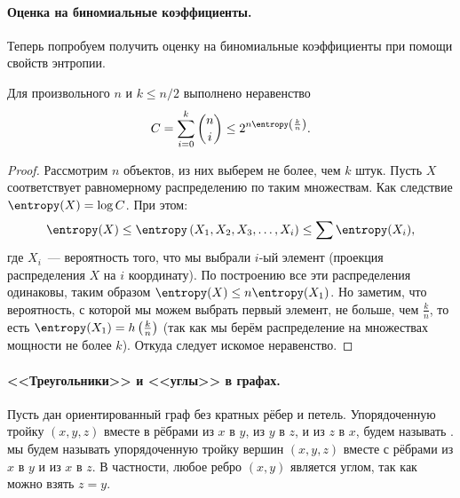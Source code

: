 \paragraph{Оценка на биномиальные коэффициенты.}
Теперь попробуем получить оценку на биномиальные коэффициенты при помощи свойств энтропии.

\begin{proposition}
    \label{prop:binomial-coef}
	Для произвольного $n$ и $k \le n / 2$ выполнено неравенство
    $$
        C = \sum_{i = 0}^k \binom{n}{i} \le 2^{n \entropy\left(\frac{k}{n}\right)}.
    $$
\end{proposition}

\begin{proof}
    Рассмотрим $n$ объектов, из них выберем не более, чем $k$ штук. Пусть $X$ соответствует равномерному
    распределению по таким множествам. Как следствие $\entropy(X) = \log C$. При этом:
    $$
        \entropy(X) \le \entropy\left(X_1, X_2, X_3, \dots, X_i\right) \le \sum \entropy(X_i),
    $$
    где $X_i$~--- вероятность того, что мы выбрали $i$-ый элемент (проекция распределения $X$ на $i$
    координату). По построению все эти распределения одинаковы, таким образом $\entropy(X) \le
    n\entropy(X_1)$. Но заметим, что вероятность, с которой мы можем выбрать первый элемент, не больше,
    чем $\frac{k}{n}$, то есть $\entropy(X_1) = h\left(\frac{k}{n}\right)$ (так как мы берём
    распределение на множествах мощности не более $k$). Откуда следует искомое неравенство.
\end{proof}


\paragraph{<<Треугольники>> и <<углы>> в графах.}
Пусть дан ориентированный граф без кратных рёбер и петель. Упорядоченную тройку $(x, y, z)$ вместе в
рёбрами из $x$ в $y$, из $y$ в $z$, и из $z$ в $x$, будем называть
.  мы будем называть упорядоченную тройку вершин $(x, y, z)$ вместе
с рёбрами из $x$ в $y$ и из $x$ в $z$. В частности, любое ребро $(x, y)$ является углом, так как можно
взять $z = y$.

